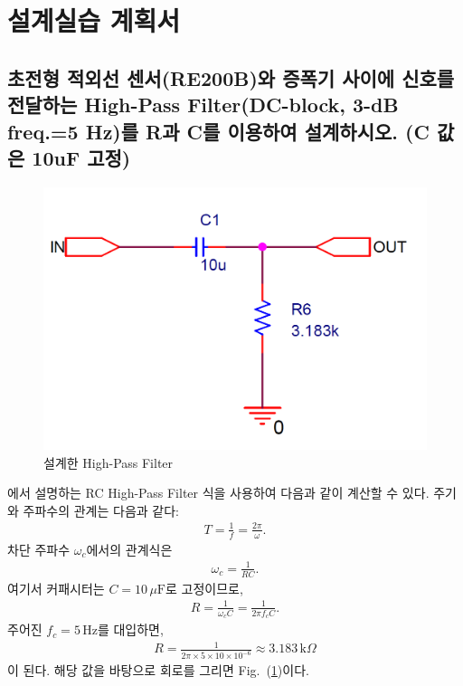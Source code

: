 \documentclass{article}
\begin{document}
\section{설계실습 계획서}
\subsection{초전형 적외선 센서(RE200B)와 증폭기 사이에 신호를 전달하는 High-Pass Filter(DC-block, 3-dB freq.=5 Hz)를 R과 C를 이용하여 설계하시오. (C 값은 10uF 고정)\label{sec1}}
\begin{figure}[H]
    \centering
    \includegraphics[width=0.5\linewidth]{figures/fig1.png}
    \caption{설계한 High-Pass Filter}
    \label{fig1}
\end{figure}
\cite{alexander2023fundamentals}에서 설명하는 RC High-Pass Filter 식을 사용하여 다음과 같이 계산할 수 있다.
주기와 주파수의 관계는 다음과 같다:
\begin{align}
    T = \frac{1}{f} = \frac{2\pi}{\omega}.
\end{align}
차단 주파수 $\omega_c$에서의 관계식은
\begin{align}
    \omega_c = \frac{1}{RC}.
\end{align}
여기서 커패시터는 $C = 10\,\mu\mathrm{F}$로 고정이므로,
\begin{align}
    R = \frac{1}{\omega_c C} = \frac{1}{2\pi f_c C}.
\end{align}
주어진 $f_c = 5\,\mathrm{Hz}$를 대입하면,
\begin{align}
    R = \frac{1}{2\pi \times 5 \times 10 \times 10^{-6}}
    \approx 3.183\,\mathrm{k}\Omega
\end{align}
이 된다. 해당 값을 바탕으로 회로를 그리면 Fig.~(\ref{fig1})이다.
\end{document}

